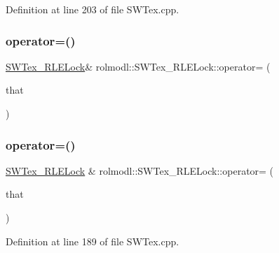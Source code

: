 Definition at line 203 of file S\+W\+Tex.\+cpp.

\mbox{\label{classrolmodl_1_1_s_w_tex___r_l_e_lock_ae7f166fad857e1d3b2df83e7e4dfcaf1}} 
\subsubsection{\texorpdfstring{operator=()}{operator=()}\hspace{0.1cm}{\footnotesize\ttfamily [1/2]}}
{\footnotesize\ttfamily \mbox{\hyperlink{classrolmodl_1_1_s_w_tex___r_l_e_lock}{S\+W\+Tex\+\_\+\+R\+L\+E\+Lock}}\& rolmodl\+::\+S\+W\+Tex\+\_\+\+R\+L\+E\+Lock\+::operator= (\begin{DoxyParamCaption}\item[{const \mbox{\hyperlink{classrolmodl_1_1_s_w_tex___r_l_e_lock}{S\+W\+Tex\+\_\+\+R\+L\+E\+Lock}} \&}]{that }\end{DoxyParamCaption})\hspace{0.3cm}{\ttfamily [delete]}}

\mbox{\label{classrolmodl_1_1_s_w_tex___r_l_e_lock_a9ffbe3f708e5c9ae3b8ec9684fd97614}} 
\subsubsection{\texorpdfstring{operator=()}{operator=()}\hspace{0.1cm}{\footnotesize\ttfamily [2/2]}}
{\footnotesize\ttfamily \mbox{\hyperlink{classrolmodl_1_1_s_w_tex___r_l_e_lock}{S\+W\+Tex\+\_\+\+R\+L\+E\+Lock}} \& rolmodl\+::\+S\+W\+Tex\+\_\+\+R\+L\+E\+Lock\+::operator= (\begin{DoxyParamCaption}\item[{\mbox{\hyperlink{classrolmodl_1_1_s_w_tex___r_l_e_lock}{S\+W\+Tex\+\_\+\+R\+L\+E\+Lock}} \&\&}]{that }\end{DoxyParamCaption})\hspace{0.3cm}{\ttfamily [noexcept]}}



Definition at line 189 of file S\+W\+Tex.\+cpp.



